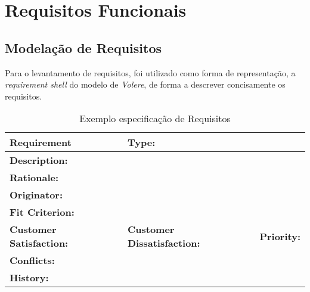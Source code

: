 \chapter{Requisitos Funcionais}

\section{Modelação de Requisitos}
Para o levantamento de requisitos, foi utilizado como forma de representação, a \textit{requirement shell} do modelo de \textit{Volere}, de forma a descrever concisamente os requisitos.

\begin{table}[H]
\centering
\begin{tabular}{|lll|} 
\hline
\textbf{Requirement}         & \textbf{Type}:         &           \\ 
\hline
\multicolumn{3}{|p{14.5cm}|}{\textbf{Description:}}    \\
\hline
\multicolumn{3}{|p{14.5cm}|}{\textbf{Rationale:} }      \\
\hline
\multicolumn{3}{|p{14.5cm}|}{\textbf{Originator:}}                                              \\ 
\hline
\multicolumn{3}{|p{14.5cm}|}{\textbf{Fit Criterion:} }                                              \\ 
\hline
\textbf{Customer Satisfaction:}  & \textbf{Customer Dissatisfaction:}  & \textbf{Priority:}               \\ 
\hline
\multicolumn{3}{|l|}{\textbf{Conflicts:}}                                                      \\
\hline
\multicolumn{3}{|l|}{\textbf{History:}} 
\\\hline
\end{tabular}
\caption{Exemplo especificação de Requisitos}
\end{table}

